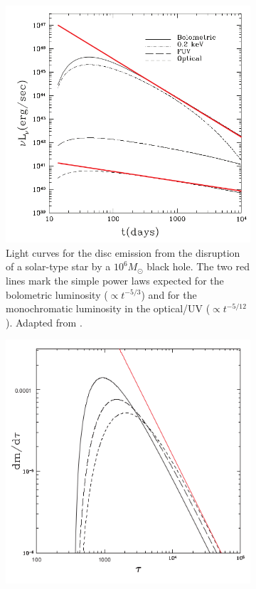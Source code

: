 \documentclass{tda}
\begin{document}
\begin{figure}
	\begin{subfigure} {.33\linewidth}
		\centering
		\captionsetup{width=.85\linewidth}
		\includegraphics[width=\textwidth]{./images/lodato_rossi2011.png}
		\caption{Light curves for the disc emission from the disruption of a solar-type star by a \(10^6 M_\odot\) black hole. The two red lines mark the simple power laws
expected for the bolometric luminosity (\(\propto t^{-5/3}\)) and for the monochromatic
luminosity in the optical/UV (\(\propto t^{-5/12}\)). Adapted from \cite{lodato_multiband_2011}.}
	\end{subfigure}
	\begin{subfigure} {.33\linewidth}
		\centering
		\captionsetup{width=.85\linewidth}
		\includegraphics[width=\textwidth]{./images/lodato2009a.png}

\end{subfigure}
\end{figure}
\end{document}
